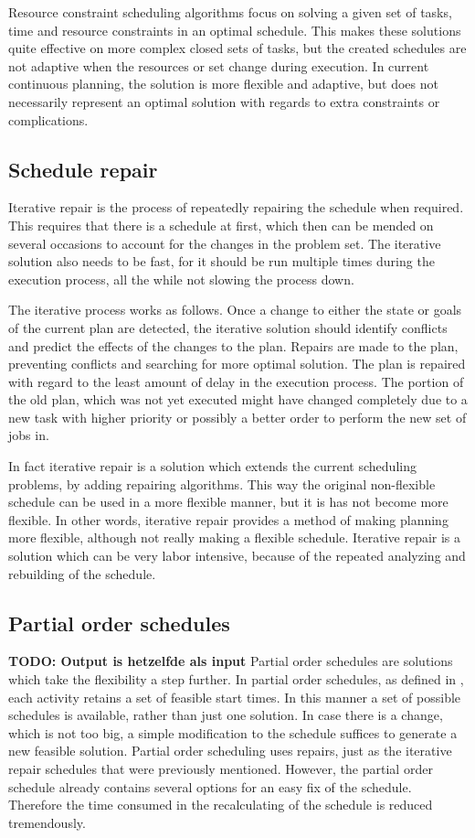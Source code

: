 \documentclass{article}
\newcommand{\TODO}[1]{{\color{red}\textbf{TODO: #1}}}
\begin{document}
Resource constraint scheduling algorithms focus on solving a given set of tasks, time and resource constraints in an optimal schedule.
This makes these solutions quite effective on more complex closed sets of tasks, but the created schedules are not adaptive when the resources or set change during execution.
In current continuous planning, the solution is more flexible and adaptive, but does not necessarily represent an optimal solution with regards to extra constraints or complications.
\cite{laborie03}

\subsection{Schedule repair}
Iterative repair is the process of repeatedly repairing the schedule when required.
This requires that there is a schedule at first, which then can be mended on several occasions to account for the changes in the problem set.
The iterative solution also needs to be fast, for it should be run multiple times during the execution process, all the while not slowing the process down.

The iterative process works as follows.
Once a change to either the state or goals of the current plan are detected, the iterative solution should identify conflicts and predict the effects of the changes to the plan.
Repairs are made to the plan, preventing conflicts and searching for more optimal solution.
The plan is repaired with regard to the least amount of delay in the execution process.
The portion of the old plan, which was not yet executed might have changed completely due to a new task with higher priority or possibly a better order to perform the new set of jobs in.
\cite{chien00}

In fact iterative repair is a solution which extends the current scheduling problems, by adding repairing algorithms.
This way the original non-flexible schedule can be used in a more flexible manner, but it is has not become more flexible.
In other words, iterative repair provides a method of making planning more flexible, although not really making a flexible schedule.
Iterative repair is a solution which can be very labor intensive, because of the repeated analyzing and rebuilding of the schedule.

\subsection{Partial order schedules}
\TODO{Output is hetzelfde als input}
Partial order schedules are solutions which take the flexibility a step further.
In partial order schedules, as defined in \cite{policella07}, each activity retains a set of feasible start times.
In this manner a set of possible schedules is available, rather than just one solution.
In case there is a change, which is not too big, a simple modification to the schedule suffices to generate a new feasible solution.
Partial order scheduling uses repairs, just as the iterative repair schedules that were previously mentioned.
However, the partial order schedule already contains several options for an easy fix of the schedule.
Therefore the time consumed in the recalculating of the schedule is reduced tremendously.
\end{document}
